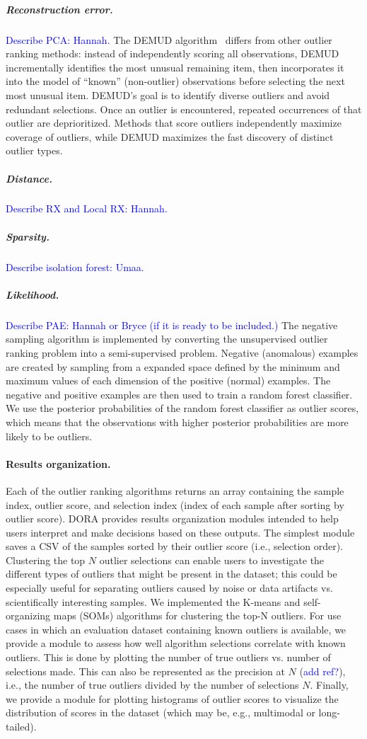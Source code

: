 \documentclass[letterpaper]{article} %
\newcommand{\todo}[1]{\textcolor{blue}{#1}}
\begin{document}
\subparagraph{Reconstruction error.}
\todo{Describe PCA: Hannah.}
The DEMUD algorithm~\citep{wagstaff:demud13} differs from other
outlier ranking methods: instead of independently scoring all
observations, DEMUD incrementally identifies the most unusual
remaining item, then incorporates it into the model of ``known''
(non-outlier) observations before selecting the next most unusual
item.  DEMUD's goal is to identify diverse outliers and avoid
redundant selections.  Once an outlier is encountered, repeated
occurrences of that outlier are deprioritized.  Methods that score
outliers independently maximize coverage of outliers, while DEMUD
maximizes the fast discovery of distinct outlier types.

\subparagraph{Distance.}
\todo{Describe RX and Local RX: Hannah.}

\subparagraph{Sparsity.}
\todo{Describe isolation forest: Umaa.}

\subparagraph{Likelihood.}
\todo{Describe PAE: Hannah or Bryce (if it is ready to be included.)}
The negative sampling algorithm is implemented by converting the unsupervised 
outlier ranking problem into a semi-supervised problem. Negative (anomalous) 
examples are created by sampling from a expanded space defined by the minimum 
and maximum values of each dimension of the positive (normal) examples. The 
negative and positive examples are then used to train a random forest 
classifier. We use the posterior probabilities of the random forest classifier 
as outlier scores, which means that the observations with higher posterior 
probabilities are more likely to be outliers.

\paragraph{Results organization.} 
Each of the outlier ranking algorithms returns an array containing the sample
index, outlier score, and selection index (index of each sample after sorting
by outlier score). DORA provides results organization modules intended to help
 users interpret and make decisions based on these outputs. The simplest 
 module saves a CSV of the samples sorted by their outlier score 
 (i.e., selection order). Clustering the top
  $N$ outlier selections can enable users to investigate the different types of 
 outliers that might be present in the dataset; this could be especially useful
 for separating outliers caused by noise or data artifacts vs. scientifically 
 interesting samples. We implemented the K-means and self-organizing maps 
 (SOMs) algorithms for clustering the top-N outliers. For use cases in which an
 evaluation dataset containing known outliers is available, we provide a module
 to assess how well algorithm selections correlate with known outliers. This is
 done by plotting the number of true outliers vs. number of selections made. 
 This can also be represented as the precision at $N$ (\todo{add ref?}), i.e., 
 the number of true outliers divided by the number of selections $N$. Finally,
 we provide a module for plotting histograms of outlier scores to visualize the
 distribution of scores in the dataset (which may be, e.g., multimodal or 
 long-tailed).
\end{document}
